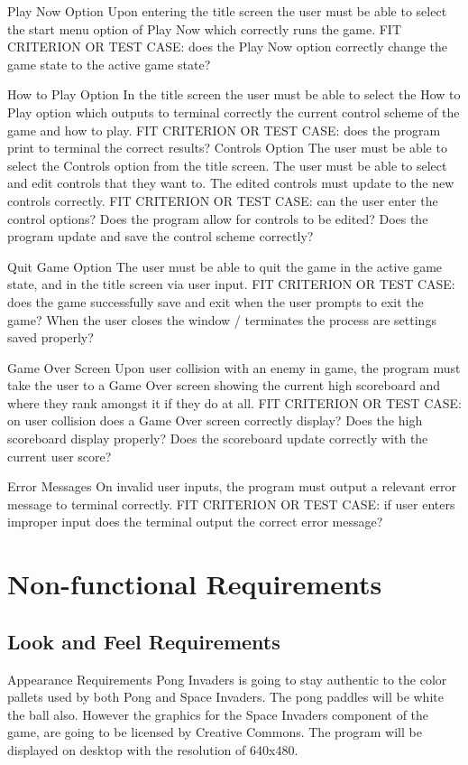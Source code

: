 \documentclass[12pt, titlepage]{article}
\begin{document}
Play Now Option
Upon entering the title screen the user must be able to select the start menu option of Play Now which correctly runs the game.
FIT CRITERION OR TEST CASE: does the Play Now option correctly change the game state to the active game state?


How to Play Option
In the title screen the user must be able to select the How to Play option which outputs to terminal correctly the current control scheme of the game and how to play.
FIT CRITERION OR TEST CASE: does the program print to terminal the correct results?
Controls Option
The user must be able to select the Controls option from the title screen. The user must be able to select and edit controls that they want to. The edited controls must update to the new controls correctly.
FIT CRITERION OR TEST CASE:  can the user enter the control options? Does the program allow for controls to be edited? Does the program update and save the control scheme correctly?


Quit Game Option
The user must be able to quit the game in the active game state, and in the title screen via user input. 
FIT CRITERION OR TEST CASE: does the game successfully save and exit when the user prompts to exit the game? When the user closes the window / terminates the process are settings saved properly?


Game Over Screen
Upon user collision with an enemy in game, the program must take the user to a Game Over screen showing the current high scoreboard and where they rank amongst it if they do at all.
FIT CRITERION OR TEST CASE: on user collision does a Game Over screen correctly display?  Does the high scoreboard display properly? Does the scoreboard update correctly with the current user score?


Error Messages
On invalid user inputs, the program must output a relevant error message to terminal correctly.
FIT CRITERION OR TEST CASE: if user enters improper input does the terminal output the correct error message?
\section{Non-functional Requirements}
\subsection{Look and Feel Requirements}
Appearance Requirements
Pong Invaders is going to stay authentic to the color pallets used by both Pong and Space Invaders. The pong paddles will be white the ball also. However the graphics for the Space Invaders component of the game, are going to be licensed by Creative Commons. The program will be displayed on desktop with the resolution of 640x480.
\end{document}
